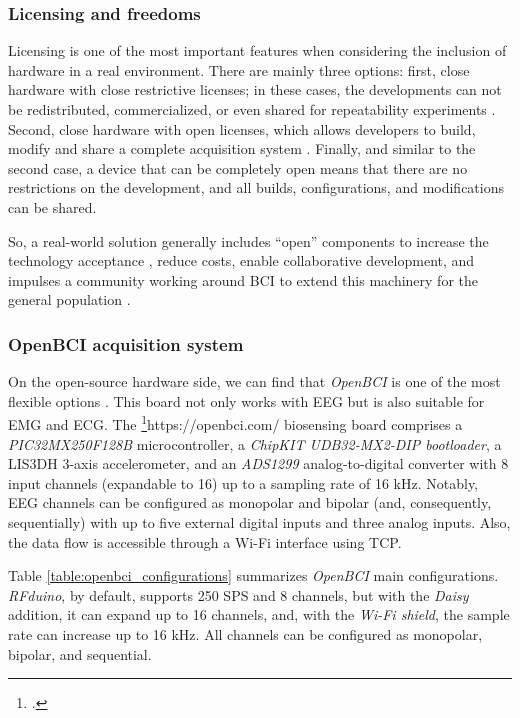 \subsubsection{Licensing and freedoms}

Licensing is one of the most important features when considering the inclusion of hardware in a real environment\cita{}. There are mainly three options: first, close hardware with close restrictive licenses; in these cases, the developments can not be redistributed, commercialized, or even shared for repeatability experiments \cite{}. Second, close hardware with open licenses, which allows developers to build, modify and share a complete acquisition system \cite{}. Finally, and similar to the second case, a device that can be completely open means that there are no restrictions on the development, and all builds, configurations, and modifications can be shared.

So, a real-world solution generally includes “open” components to increase the technology acceptance \cite{powell2012democratizing,  legenvre2020open}, reduce costs, enable collaborative development, and impulses a community working around \gls*{BCI} to extend this machinery for the general population \cite{wolpaw2012brain}.

\subsubsection{OpenBCI acquisition system}

On the open-source hardware side, we can find that \textit{OpenBCI} is one of the most flexible options \cite{laport2019comparative}. This board not only works with \gls*{EEG} but is also suitable for \gls*{EMG} and \gls*{ECG}. The \footcite{OpenBCI Cyton}{https://openbci.com/} biosensing board comprises a \textit{PIC32MX250F128B} microcontroller, a \textit{ChipKIT UDB32-MX2-DIP bootloader}, a LIS3DH 3-axis accelerometer, and an \textit{ADS1299} analog-to-digital converter with 8 input channels (expandable to 16) up to a sampling rate of 16 kHz. Notably, \gls*{EEG} channels can be configured as monopolar and bipolar (and, consequently, sequentially) with up to five external digital inputs and three analog inputs. Also, the data flow is accessible through a Wi-Fi interface using \gls*{TCP}. 

Table \ref{table:openbci_configurations} summarizes \textit{OpenBCI} main configurations. \textit{RFduino}, by default, supports 250 \gls*{SPS} and 8 channels, but with the \textit{Daisy} addition, it can expand up to 16 channels, and, with the \textit{Wi-Fi shield}, the sample rate can increase up to 16 kHz. All channels can be configured as monopolar, bipolar, and sequential.

